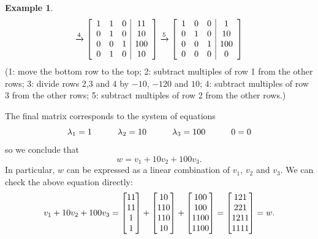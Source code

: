 \documentclass[reqno]{amsart}
\theoremstyle{definition}
\newtheorem{example}[theorem]{Example}
\begin{document}
\begin{example}
\[  \xrightarrow{4}
  \left[\begin{array}{ccc|c}
    1 &   1 &    0 & 11 \\
    0 &   1 &    0 & 10 \\
    0 &   0 &    1 & 100 \\
    0 &   1 &    0 & 10
  \end{array}\right]
  \xrightarrow{5}
  \left[\begin{array}{ccc|c}
    1 &   0 &    0 & 1 \\
    0 &   1 &    0 & 10 \\
    0 &   0 &    1 & 100 \\
    0 &   0 &    0 & 0
  \end{array}\right]
 \]
 (1: move the bottom row to the top; 2: subtract multiples of row 1
 from the other rows; 3: divide rows 2,3 and 4 by $-10$, $-120$ and
 $10$; 4: subtract multiples of row 3 from the other rows; 5: subtract
 multiples of row 2 from the other rows.)

 The final matrix corresponds to the system of equations
 \[ \lambda_1 = 1 \hspace{3em}
    \lambda_2 = 10 \hspace{3em}
    \lambda_3 = 100 \hspace{3em}
     0 = 0
 \]
 so we conclude that
 \[ w = v_1 + 10 v_2 + 100 v_3. \]
 In particular, $w$ can be expressed as a linear combination of $v_1$,
 $v_2$ and $v_3$.  We can check the above equation directly:
 \[ v_1 + 10 v_2 + 100 v_3 =
      \left[\begin{matrix}  11 \\  11 \\    1 \\    1 \end{matrix}\right] +
      \left[\begin{matrix}  10 \\ 110 \\  110 \\   10 \end{matrix}\right] +
      \left[\begin{matrix} 100 \\ 100 \\ 1100 \\ 1100 \end{matrix}\right]
    = \left[\begin{matrix} 121 \\ 221 \\ 1211 \\ 1111 \end{matrix}\right] = w.
 \]
\end{example}
\end{document}
